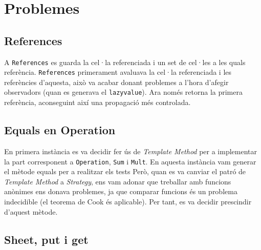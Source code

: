 \documentclass{article}
\begin{document}
	\section{Problemes}
	\subsection{References}%
	A \texttt{References} es guarda la cel·la referenciada i un set de cel·les a les quals referència.
	\texttt{References} primerament avaluava la cel·la referenciada i les referències d'aquesta,
	això va acabar donant problemes a l'hora d'afegir observadors (quan es generava el \texttt{lazyvalue}).
	Ara només retorna la primera referència, aconseguint així una propagació més controlada.

	\subsection{Equals en Operation}%
En primera instància es va decidir fer ús de \textit{Template Method} per a implementar la part corresponent 
a \texttt{Operation}, \texttt{Sum} i \texttt{Mult}. En aquesta instància vam generar el mètode equals per a
realitzar els tests Però, quan es va canviar el patró de \textit{Template Method} a \textit{Strategy},
ens vam adonar que treballar amb funcions anònimes ens donava problemes, ja que comparar 
funcions és un problema indecidible (el teorema de Cook és aplicable). Per tant, es va decidir prescindir 
d'aquest mètode. 
	\subsection{Sheet, put i get}%
	
\end{document}
